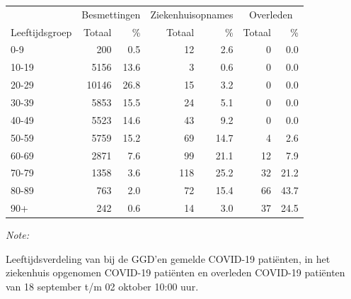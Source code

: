 \documentclass[
  english,
  man,floatsintext]{apa6}
\begin{document}
\begin{table}[H]
\centering\begingroup\fontsize{11}{13}\selectfont

\begin{threeparttable}
\begin{tabular}{lrrrrrr}
\toprule
\multicolumn{1}{c}{ } & \multicolumn{2}{c}{Besmettingen} & \multicolumn{2}{c}{Ziekenhuisopnames} & \multicolumn{2}{c}{Overleden} \\
\cmidrule(l{3pt}r{3pt}){2-3} \cmidrule(l{3pt}r{3pt}){4-5} \cmidrule(l{3pt}r{3pt}){6-7}
Leeftijdsgroep & Totaal & \% & Totaal & \% & Totaal & \%\\
\midrule
0-9 & 200 & 0.5 & 12 & 2.6 & 0 & 0.0\\
10-19 & 5156 & 13.6 & 3 & 0.6 & 0 & 0.0\\
20-29 & 10146 & 26.8 & 15 & 3.2 & 0 & 0.0\\
30-39 & 5853 & 15.5 & 24 & 5.1 & 0 & 0.0\\
40-49 & 5523 & 14.6 & 43 & 9.2 & 0 & 0.0\\
50-59 & 5759 & 15.2 & 69 & 14.7 & 4 & 2.6\\
60-69 & 2871 & 7.6 & 99 & 21.1 & 12 & 7.9\\
70-79 & 1358 & 3.6 & 118 & 25.2 & 32 & 21.2\\
80-89 & 763 & 2.0 & 72 & 15.4 & 66 & 43.7\\
90+ & 242 & 0.6 & 14 & 3.0 & 37 & 24.5\\
\bottomrule
\end{tabular}
\begin{tablenotes}
\item \textit{Note: } 
\item Leeftijdsverdeling van bij de GGD’en gemelde COVID-19 patiënten, in het ziekenhuis opgenomen COVID-19 patiënten en overleden COVID-19 patiënten van 18 september t/m 02 oktober 10:00 uur.
\end{tablenotes}
\end{threeparttable}
\endgroup{}
\end{table}
\end{document}

